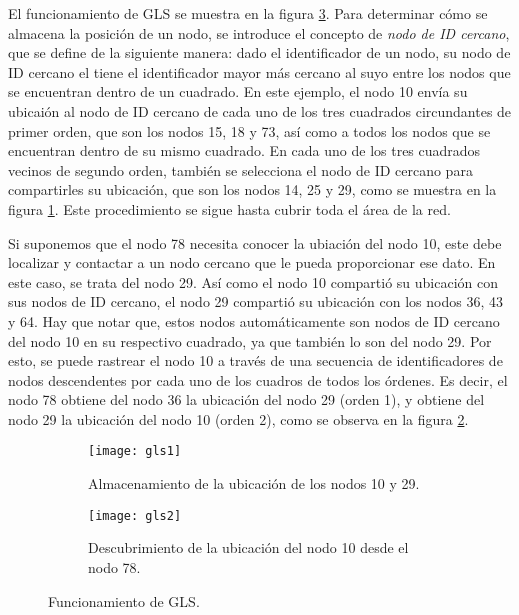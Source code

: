El funcionamiento de GLS se muestra en la figura \ref{fig:gls}. Para determinar
cómo se almacena la posición de un nodo, se introduce el concepto de
\textit{nodo de ID cercano}, que se define de la siguiente manera: dado el
identificador de un nodo, su nodo de ID cercano el tiene el identificador mayor
más cercano al suyo entre los nodos que se encuentran dentro de un cuadrado. En
este ejemplo, el nodo 10 envía su ubicaión al nodo de ID cercano de cada uno de
los tres cuadrados circundantes de primer orden, que son los nodos 15, 18 y 73,
así como a todos los nodos que se encuentran dentro de su mismo cuadrado. En
cada uno de los tres cuadrados vecinos de segundo orden, también se selecciona
el nodo de ID cercano para compartirles su ubicación, que son los nodos 14, 25
y 29, como se muestra en la figura \ref{fig:gls1}. Este procedimiento se sigue
hasta cubrir toda el área de la red.

Si suponemos que el nodo 78 necesita conocer la ubiación del nodo 10, este debe
localizar y contactar a un nodo cercano que le pueda proporcionar ese dato. En
este caso, se trata del nodo 29. Así como el nodo 10 compartió su ubicación con
sus nodos de ID cercano, el nodo 29 compartió su ubicación con los nodos 36, 43
y 64. Hay que notar que, estos nodos automáticamente son nodos de ID cercano del
nodo 10 en su respectivo cuadrado, ya que también lo son del nodo 29. Por esto,
se puede rastrear el nodo 10 a través de una secuencia de identificadores de
nodos descendentes por cada uno de los cuadros de todos los órdenes. Es decir,
el nodo 78 obtiene del nodo 36 la ubicación del nodo 29 (orden 1), y obtiene
del nodo 29 la ubicación del nodo 10 (orden 2), como se observa en la figura
\ref{fig:gls2}.

\begin{figure}[th]
\centering

\begin{subfigure}[b]{\textwidth}
\centering
\texttt{[image: gls1]}
\caption{Almacenamiento de la ubicación de los nodos 10 y 29.}
\label{fig:gls1}
\end{subfigure}
\hfill
\begin{subfigure}[b]{\textwidth}
\centering
\texttt{[image: gls2]}
\caption{Descubrimiento de la ubicación del nodo 10 desde el nodo 78.}
\label{fig:gls2}
\end{subfigure}

\decoRule
\caption[Funcionamiento de GLS]{Funcionamiento de GLS\protect\footnotemark.}
\label{fig:gls}
\end{figure}

